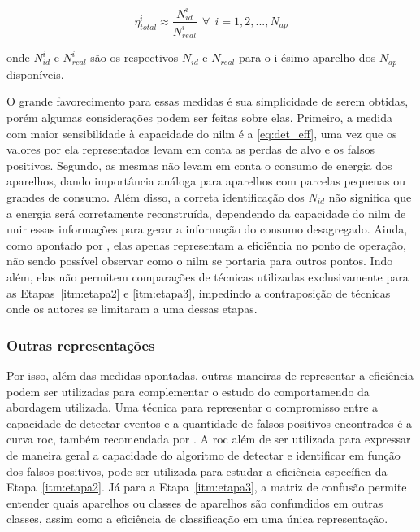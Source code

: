 \begin{equation}\label{eq:app_eff}
\eta_{total}^i\approx\frac{N_{id}^i}{N_{real}^i} ~~ \forall ~~ i =
1,2,...,N_{ap}
\end{equation}

\noindent onde $N_{id}^i$ e $N_{real}^i$ são os respectivos
$N_{id}$ e $N_{real}$ para o i-ésimo aparelho dos $N_{ap}$
disponíveis.

O grande favorecimento para essas medidas é sua simplicidade de serem
obtidas, porém algumas considerações podem ser feitas sobre elas.
Primeiro, a medida com maior sensibilidade à capacidade do \gls{nilm}
é a \ref{eq:det_eff}, uma vez que os valores por ela representados
levam em conta as perdas de alvo e os falsos positivos.
Segundo, as mesmas não levam em conta o consumo de energia dos
aparelhos, dando importância análoga para aparelhos com parcelas
pequenas ou grandes de consumo. Além disso, a correta identificação
dos $N_{id}$ não significa que a energia será corretamente
reconstruída, dependendo da capacidade do \gls{nilm} de unir essas
informações para gerar a informação do consumo desagregado.  Ainda,
como apontado por \cite{nilm_zeifman_review_2011}, elas apenas
representam a eficiência no ponto de operação, não sendo possível
observar como o \gls{nilm} se portaria para outros pontos. Indo além,
elas não permitem comparações de técnicas utilizadas exclusivamente para
as Etapas~\ref{itm:etapa2} e \ref{itm:etapa3}, impedindo a
contraposição de técnicas onde os autores se limitaram a uma dessas
etapas.

\subsubsection{Outras representações}
\label{top:outras_eff}

Por isso, além das medidas apontadas, outras maneiras de representar
a eficiência podem ser utilizadas para complementar o estudo do
comportamendo da abordagem utilizada. Uma técnica para representar o
compromisso entre a capacidade de detectar eventos e a quantidade de
falsos positivos encontrados é a curva \gls{roc}, também recomendada
por \cite{nilm_zeifman_review_2011}. A \gls{roc} além de ser utilizada
para expressar de maneira geral a capacidade do algoritmo de detectar
e identificar em função dos falsos positivos, pode ser utilizada para
estudar a eficiência específica da Etapa~\ref{itm:etapa2}. Já para a
Etapa~\ref{itm:etapa3}, a matriz de confusão permite entender quais
aparelhos ou classes de aparelhos são confundidos em outras classes,
assim como a eficiência de classificação em uma única representação.

